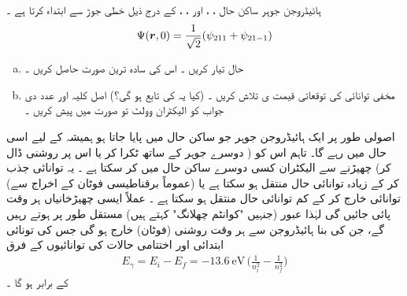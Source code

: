 ہائیڈروجن  جوہر ساکن  حال ، ،   اور  ، ،   کے درج ذیل خطی جوڑ سے ابتداء کرتا ہے ۔
\begin{align*}
\Psi({{\boldsymbol{r}}},0)=\frac{1}{\sqrt{2}}(\psi_{211}+\psi_{21-1})
\end{align*}
\begin{enumerate}[a.]
\item
حال  تیار کریں ۔ اس کی سادہ ترین صورت حاصل کریں ۔
\item
مخفی توانائی  کی توقعاتی قیمت ی    تلاش کریں ۔ (کیا یہ   کی  تابع ہو گی؟)  اصل کلیہ اور عدد دی جواب   کو الیکٹران وولٹ تو صورت میں پیش کریں ۔
\end{enumerate}

اصولی طور پر ایک ہائیڈروجن جوہر جو ساکن حال  میں پایا جاتا ہو  ہمیشہ کے لیے اسی حال میں رہے گا۔ تاہم اس کو (  دوسرے جوہر کے ساتھ ٹکرا کر  یا اس پر روشنی  ڈال کر)  چھیڑنے سے الیکٹران کسی دوسرے ساکن حال میں  کر سکتا ہے ۔ یہ توانائی جذب کر کے زیادہ توانائی  حال منتقل ہو سکتا ہے یا   (عموماً   برقناطیسی   فوٹان کے  اخراج   سے)     توانائی خارج کر  کے کم توانائی  حال  منتقل ہو سکتا ہے ۔ عملاً  ایسی چھیڑخانیاں  ہر وقت پائی جائیں گی لہٰذا عبور (جنہیں  "کوانٹم  چھلانگ" کہتے ہیں)   مستقل طور پر ہوتے  رہیں    گے، جن  کی  بنا  ہائیڈروجن  سے ہر وقت   روشنی (فوٹان)  خارج ہو گی جس کی تونائی   ابتدائی اور اختتامی حالات کی  توانائیوں  کے فرق
\begin{align}
E_{\gamma}=E_{i}-E_{f}=\SI{-13.6}{\electronvolt}\,\big(\frac{1}{n^{2}_{i}}-\frac{1}{n^{2}_{f}}\big)
\end{align}
 کے برابر ہو گا ۔
 
